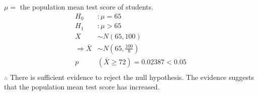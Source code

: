 \documentclass[class=article, crop=false]{standalone}
\begin{document}
$\mu =$ the population mean test score of students. 
\begin{align*}
H_0&: \mu = 65 \\
H_1&: \mu > 65 \\
X & \sim N(65, 100) \\
\Rightarrow \bar{X} & \sim N(65, \frac{100}{8}) \\
p&(\bar{X} \geqslant 72) = 0.02387 < 0.05 \\
\end{align*}  
$\therefore$ There is sufficient evidence to reject the null hypothesis. The evidence suggests that the population mean test score has increased. 
\end{document}

